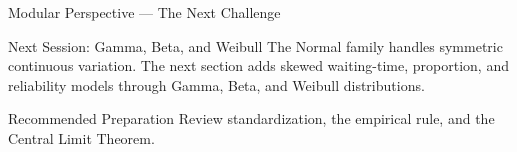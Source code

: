 \documentclass[aspectratio=169,xcolor={dvipsnames,table}]{beamer}
\begin{document}
\begin{frame}{Modular Perspective --- The Next Challenge}
\scriptsize
\begin{alertblock}{Next Session: Gamma, Beta, and Weibull}
The Normal family handles symmetric continuous variation. The next section adds
skewed waiting-time, proportion, and reliability models through Gamma, Beta, and
Weibull distributions.
\end{alertblock}
\begin{block}{Recommended Preparation}
Review standardization, the empirical rule, and the Central Limit Theorem.
\end{block}
\end{frame}
\end{document}
